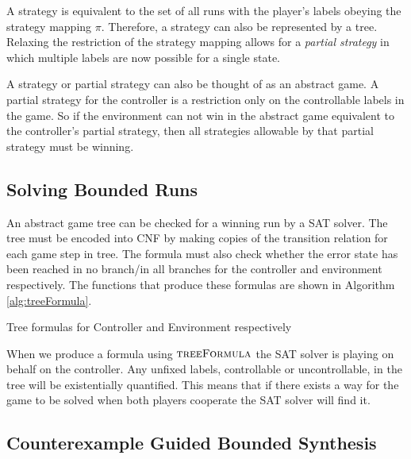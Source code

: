 \documentclass{llncs}
\begin{document}
A strategy is equivalent to the set of all runs with the player's labels
obeying the strategy mapping $\pi$. Therefore, a strategy can also be
represented by a tree. Relaxing the restriction of the strategy mapping allows
for a \emph{partial strategy} in which multiple labels are now possible for a
single state.

A strategy or partial strategy can also be thought of as an abstract game. A
partial strategy for the controller is a restriction only on the controllable
labels in the game. So if the environment can not win in the abstract game
equivalent to the controller's partial strategy, then all strategies allowable
by that partial strategy must be winning.

\subsection{Solving Bounded Runs}

An abstract game tree can be checked for a winning run by a SAT solver.  The
tree must be encoded into CNF by making copies of the transition relation for
each game step in tree. The formula must also check whether the error state has
been reached in no branch/in all branches for the controller and environment
respectively. The functions that produce these formulas are shown in Algorithm
\ref{alg:treeFormula}.

\begin{algorithm}
    \caption{Tree formulas for Controller and Environment respectively}
    \label{alg:treeFormula}
    \begin{algorithmic}
        \State {}
        \Else
        \State {}
        \EndIf
        \EndFunction
    \end{algorithmic}

    \begin{algorithmic}
        \State {}
        \Else
        \State {}
        \EndIf
        \EndFunction
    \end{algorithmic}
\end{algorithm}

When we produce a formula using $\textsc{treeFormula}$ the SAT solver is
playing on behalf on the controller. Any unfixed labels, controllable or
uncontrollable, in the tree will be existentially quantified. This means that
if there exists a way for the game to be solved when both players cooperate the
SAT solver will find it.

\subsection{Counterexample Guided Bounded Synthesis}
\end{document}

